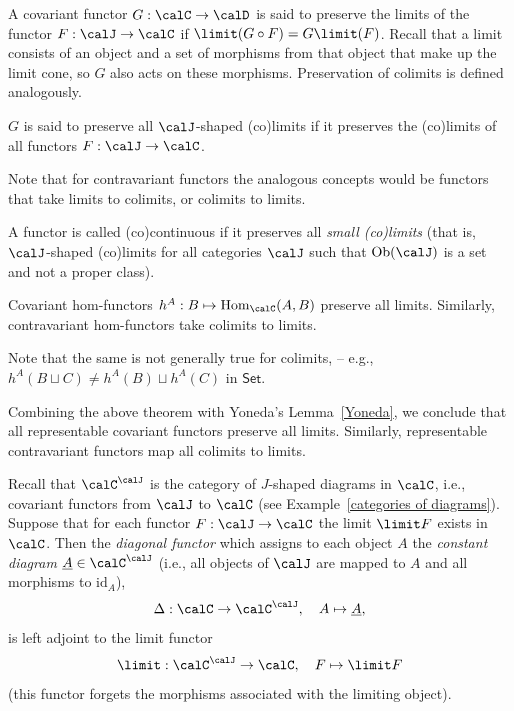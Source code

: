 \begin{defn}
    A covariant functor $G:\calC \to\calD $ is said to preserve the limits of the functor $F:\calJ \to \calC $ if $\limit(G\circ F)=G \limit(F)$. Recall that a limit consists of an object and a set of morphisms from that object that make up the limit cone, so $G$ also acts on these morphisms. Preservation of colimits is defined analogously.

    $G$ is said to preserve all $\calJ$-shaped (co)limits if it preserves the (co)limits of all functors $F:\calJ\to \calC $. 

    Note that for contravariant functors the analogous concepts would be functors that take limits to colimits, or colimits to limits.
\end{defn}    
\begin{defn}
    A functor is called (co)continuous if it preserves all \emph{small (co)limits} (that is, $\calJ$-shaped (co)limits for all categories $\calJ$ such that $\mathrm{Ob}(\calJ)$ is a set and not a proper class).
\end{defn}
\begin{thm}
    Covariant hom-functors $h^A:B\mapsto\allowbreak \mathrm{Hom}_{\calC }(A,B)$ preserve all limits. Similarly, contravariant hom-functors take colimits to limits.
\end{thm}
\begin{rem}
     Note that the same is not generally true for colimits, -- e.g., $h^A(B\sqcup C)\neq h^A(B)\sqcup h^A(C)$ in $\mathsf{Set}$.
\end{rem}
\begin{cor}
    Combining the above theorem with Yoneda's Lemma~\ref{Yoneda}, we conclude that all representable covariant functors preserve all limits. Similarly, representable contravariant functors map all colimits to limits.
\end{cor}
\begin{thm}\label{thm diagonal functor adjoint to limit}
    Recall that $\calC ^\calJ $ is the category of $J$-shaped diagrams in $\calC $, i.e., covariant functors from $\calJ $ to $\calC $ (see Example~\ref{categories of diagrams}). Suppose that for each functor $F:\calJ \to\calC $ the limit $\limit F$ exists in $\calC $. Then the \emph{diagonal functor} which assigns to each object $A$ the \emph{constant diagram} $\underline A\in \calC ^\calJ $ (i.e., all objects of $\calJ $ are mapped to $A$ and all morphisms to $\mathrm{id}_A$),
    \[\Delta: \calC \to \calC ^{\calJ},\quad A\mapsto \underline{A},\]
    is left adjoint to the limit functor
    \[\limit: \calC ^\calJ \to \calC,\quad F\mapsto \limit F\]
    (this functor forgets the morphisms associated with the limiting object).
\end{thm}
